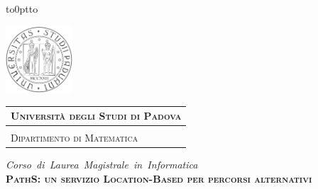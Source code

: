 \documentclass[a4paper, 12pt, twoside, openright]{book}
\begin{document}
\frontmatter

\begin{titlepage} %
\begin{center}
\vbox to0pt{\vbox to\vss}

\hspace{0.5cm}
\begin{minipage}{.20\textwidth}
  \includegraphics[height=2.5cm]{unipd-bn.png}
\end{minipage}\begin{minipage}{.90\textwidth}
  \begin{table}[H]
  \begin{tabular}{l}
  \scshape{\Large{\bfseries{Università degli Studi di Padova}}} \\
  \hline \\
  \scshape{\Large{Dipartimento di Matematica}} \\
  \end{tabular}
  \end{table}
\end{minipage}

\vspace{1cm}
\emph{\Large{Corso~di~Laurea~Magistrale~in~Informatica}} \\
\vspace{2.5cm}
\scshape{\Large{\bfseries{PathS: un servizio Location-Based per percorsi alternativi}}} \\
\end{center}


\end{titlepage}
\end{document}
